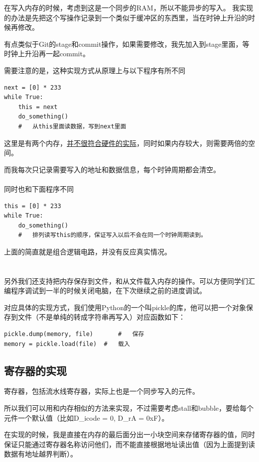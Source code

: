 \documentclass{article}
\begin{document}
在写入内存的时候，考虑到这是一个同步的RAM，所以不能异步的写入。
我实现的办法是先把这个写操作记录到一个类似于缓冲区的东西里，当在时钟上升沿的时候再修改。

有点类似于Git的stage和commit操作，如果需要修改，我先加入到stage里面，等时钟上升沿再一起commit。

需要注意的是，这种实现方式从原理上与以下程序有所不同
\begin{lstlisting}[frame=single]
next = [0] * 233
while True:
	this = next
	do_something()
	#	从this里面读数据，写到next里面
\end{lstlisting}

这里是有两个内存，\underline{并不很符合硬件的实际}，同时如果内存较大，则需要两倍的空间。

而我每次只记录需要写入的地址和数据信息，每个时钟周期都会清空。\\\\
\indent 同时也和下面程序不同
\begin{lstlisting}[frame=single]
this = [0] * 233
while True:
	do_something()
	#	排列读写this的顺序，保证写入以后不会在同一个时钟周期读到。
\end{lstlisting}

上面的简直就是组合逻辑电路，并没有反应真实情况。
\\
\\
\\
\indent 另外我们还支持把内存保存到文件，和从文件载入内存的操作。可以方便同学们汇编程序调试到一半的时候关闭电脑，在下次继续之前的进度调试。

对应具体的实现方式，我们使用Python的一个叫pickle的库，他可以把一个对象保存到文件（不是单纯的转成字符串再写入）对应函数如下：
\begin{lstlisting}[frame=single]
pickle.dump(memory, file)		#	保存
memory = pickle.load(file)	#	载入
\end{lstlisting}

\subsection{寄存器的实现}
寄存器，包括流水线寄存器，实际上也是一个同步写入的元件。

所以我们可以用和内存相似的方法来实现，不过需要考虑stall和bubble，要给每个元件一个默认值（比如D\_icode = 0, D\_rA = 0xF）。

在实现的时候，我是直接在内存的最后面分出一小块空间来存储寄存器的值，同时保证只能通过寄存器名称访问他们，而不能直接根据地址读出值（因为上面提到读数据有地址越界判断）。
\end{document}

